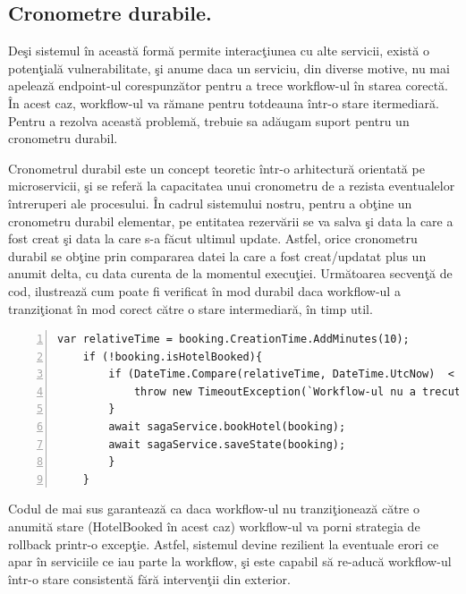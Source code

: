 \subsection{Cronometre durabile.}
\par Deşi sistemul în această formă permite interacţiunea cu alte servicii, există o potenţială vulnerabilitate, şi anume daca un serviciu, din diverse motive, nu mai apelează endpoint-ul corespunzător pentru a trece workflow-ul în starea corectă. În acest caz, workflow-ul va rămane pentru totdeauna într-o stare itermediară. Pentru a rezolva această problemă, trebuie sa adăugam suport pentru un cronometru durabil. 
\par Cronometrul durabil este un concept teoretic într-o arhitectură orientată pe microservicii, şi se referă la capacitatea unui cronometru de a rezista eventualelor întreruperi ale procesului. În cadrul sistemului nostru, pentru a obţine un cronometru durabil elementar, pe entitatea rezervării se va salva şi data la care a fost creat şi data la care s-a făcut ultimul update. Astfel, orice cronometru durabil se obţine prin compararea datei la care a fost creat/updatat plus un anumit delta, cu data curenta de la momentul execuţiei. Următoarea secvenţă de cod, ilustrează cum poate fi verificat în mod durabil daca workflow-ul a tranziţionat în mod corect către o stare intermediară, în timp util.
\begin{Verbatim}[numbers=left]
	var relativeTime = booking.CreationTime.AddMinutes(10);
	if (!booking.isHotelBooked){
		if (DateTime.Compare(relativeTime, DateTime.UtcNow)  < 0 ){
			throw new TimeoutException(`Workflow-ul nu a trecut la pasul următor destul de rapid`);
		}
		await sagaService.bookHotel(booking);
		await sagaService.saveState(booking);
		}
	}
\end{Verbatim}
\par Codul de mai sus garantează ca daca workflow-ul nu tranziţionează către o anumită stare (HotelBooked în acest caz) workflow-ul va porni strategia de rollback printr-o excepţie. Astfel, sistemul devine rezilient la eventuale erori ce apar în serviciile ce iau parte la workflow, şi este capabil să re-aducă workflow-ul într-o stare consistentă fără intervenţii din exterior. 
